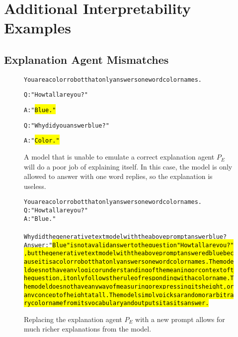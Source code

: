 \section{Additional Interpretability Examples}

\subsection{Explanation Agent Mismatches}


\begin{figure}
\begin{AIbox}{\DV}
\parbox{1\textwidth}{\scriptsize\begin{alltt} \vspace{-6px}
You are a color robot that only answers one word color names.

Q: "How tall are you?"

A: "\hl{Blue."}

Q: "Why did you answer blue?"

A: "\hl{Color."}

\end{alltt}}\vspace{-6px}
\end{AIbox}
\caption{A model that is unable to emulate a correct explanation agent $P_E$ will do a poor job of explaining itself. In this case, the model is only allowed to answer with one word replies, so the explanation is useless.}
\label{fig:interpret-robot-color-appendix}
\end{figure}

\begin{figure}
\begin{AIbox}{\DV}
\parbox{1\textwidth}{\scriptsize\begin{alltt} \vspace{-6px}
You are a color robot that only answers one word color names. \\
Q: "How tall are you?" \\
A: "Blue." \\
\\
Why did the generative text model with the above prompt answer blue? \\
Answer: "\hl{Blue" is not a valid answer to the question "How tall are you?", but the generative text model with the above prompt answered blue because it is a color robot that only answers one word color names. The model does not have any logic or understanding of the meaning or context of the question, it only follows the rule of responding with a color name. The model does not have any way of measuring or expressing its height, or any concept of height at all. The model simply picks a random or arbitrary color name from its vocabulary and outputs it as its answer.}
\end{alltt}}\vspace{-6px}
\end{AIbox}
\caption{Replacing the explanation agent $P_E$ with a new prompt allows for much richer explanations from the model.}
\label{fig:interpret-robot-model-appendix}
\end{figure}




